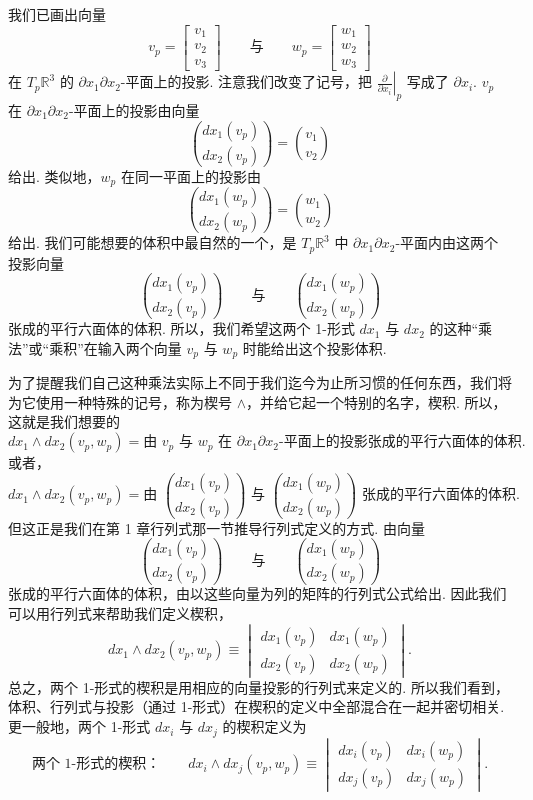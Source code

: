 我们已画出向量
\[
v_p=\begin{bmatrix}v_1\\v_2\\v_3\end{bmatrix}\qquad\text{与}\qquad w_p=\begin{bmatrix}w_1\\w_2\\w_3\end{bmatrix}
\]
在 $T_p\mathbb{R}^3$ 的 $\partial x_1\partial x_2$-平面上的投影. 注意我们改变了记号，把 $\left.\frac{\partial}{\partial x_i}\right|_p$ 写成了 $\partial x_i$. $v_p$ 在 $\partial x_1\partial x_2$-平面上的投影由向量
\[
\binom{dx_1(v_p)}{dx_2(v_p)}=\binom{v_1}{v_2}
\]
给出. 类似地，$w_p$ 在同一平面上的投影由
\[
\binom{dx_1(w_p)}{dx_2(w_p)}=\binom{w_1}{w_2}
\]
给出. 我们可能想要的体积中最自然的一个，是 $T_p\mathbb{R}^3$ 中 $\partial x_1\partial x_2$-平面内由这两个投影向量
\[
\binom{dx_1(v_p)}{dx_2(v_p)}\qquad\text{与}\qquad\binom{dx_1(w_p)}{dx_2(w_p)}
\]
张成的平行六面体的体积. 所以，我们希望这两个 1-形式 $dx_1$ 与 $dx_2$ 的这种``乘法''或``乘积''在输入两个向量 $v_p$ 与 $w_p$ 时能给出这个投影体积.

为了提醒我们自己这种乘法实际上不同于我们迄今为止所习惯的任何东西，我们将为它使用一种特殊的记号，称为楔号 $\wedge$，并给它起一个特别的名字，楔积. 所以，这就是我们想要的
\[
dx_1\wedge dx_2(v_p,w_p)=\text{由 }v_p\text{ 与 }w_p\text{ 在 }\partial x_1\partial x_2\text{-平面上的投影张成的平行六面体的体积}.
\]
或者，
\[
dx_1\wedge dx_2(v_p,w_p)=\text{由 }\binom{dx_1(v_p)}{dx_2(v_p)}\text{ 与 }\binom{dx_1(w_p)}{dx_2(w_p)}\text{ 张成的平行六面体的体积}.
\]
但这正是我们在第 1 章行列式那一节推导行列式定义的方式. 由向量
\[
\binom{dx_1(v_p)}{dx_2(v_p)}\qquad\text{与}\qquad\binom{dx_1(w_p)}{dx_2(w_p)}
\]
张成的平行六面体的体积，由以这些向量为列的矩阵的行列式公式给出. 因此我们可以用行列式来帮助我们定义楔积，
\[
dx_1\wedge dx_2(v_p,w_p)\equiv
\begin{vmatrix}
dx_1(v_p) & dx_1(w_p)\\
dx_2(v_p) & dx_2(w_p)
\end{vmatrix}.
\]
总之，两个 1-形式的楔积是用相应的向量投影的行列式来定义的. 所以我们看到，体积、行列式与投影（通过 1-形式）在楔积的定义中全部混合在一起并密切相关. 更一般地，两个 1-形式 $dx_i$ 与 $dx_j$ 的楔积定义为
\[
\text{两个 1-形式的楔积：}\qquad
dx_i\wedge dx_j(v_p,w_p)\equiv
\begin{vmatrix}
dx_i(v_p) & dx_i(w_p)\\
dx_j(v_p) & dx_j(w_p)
\end{vmatrix}.
\]

